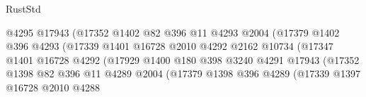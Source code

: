 \begin{lexlean}{RustStd}
\begin{coremodule}
                                          @4295
                                          @17943
                                          (@17352
                                            @1402
                                            @82
                                            @396
                                            @11
                                            @4293
                                            @2004
                                            (@17379
                                              @1402
                                              @396
                                              @4293
                                              (@17339
                                                @1401
                                                @16728
                                                @2010
                                                @4292
                                                @2162
                                                @10734
                                                (@17347
                                                  @1401
                                                  @16728
                                                  @4292
                                                  (@17929
                                                    @1400
                                                    @180
                                                    @398
                                                    @3240
                                                    @4291
                                                    @17943
                                                    (@17352
                                                      @1398
                                                      @82
                                                      @396
                                                      @11
                                                      @4289
                                                      @2004
                                                      (@17379
                                                        @1398
                                                        @396
                                                        @4289
                                                        (@17339
                                                          @1397
                                                          @16728
                                                          @2010
                                                          @4288

\end{coremodule}
\end{lexlean}
